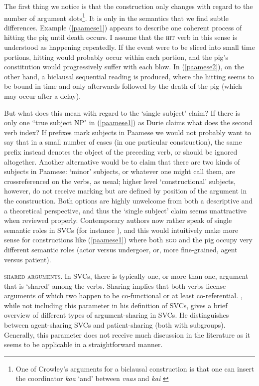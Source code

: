 The first thing we notice is that the construction only changes with regard to the number of argument slots\footnote{One of Crowley's arguments for a biclausal construction is that one can insert the coordinator \textit{kaa} `and' between \textit{vuas} and \textit{kai} \citep[56]{crowley2002serial}}. It is only in the semantics that we find subtle differences. Example (\ref{paamese1}) appears to describe one coherent process of hitting the pig until death occurs. I assume that the \textsc{hit} verb in this sense is understood as happening repeatedly. If the event were to be sliced into small time portions, hitting would probably occur within each portion, and the pig's constitution would progressively suffer with each blow. In (\ref{paamese2}), on the other hand, a biclausal sequential reading is produced, where the hitting seems to be bound in time and only afterwards followed by the death of the pig (which may occur after a delay). 

But what does this mean with regard to the `single subject' claim? If there is only one ``true subject NP" in (\ref{paamese1}) as Durie claims what does the second verb index? If prefixes mark subjects in Paamese we would not probably want to say that in a small number of cases (in one particular construction), the same prefix instead denotes the object of the preceding verb, or should be ignored altogether. Another alternative would be to claim that there are two kinds of subjects in Paamese: `minor' subjects, or whatever one might call them, are crossreferenced on the verbs, as usual; higher level `constructional' subjects, however, do not receive marking but are defined by position of the argument in the construction. Both options are highly unwelcome from both a descriptive and a theoretical perspective, and thus the `single subject' claim seems unattractive when reviewed properly. Contemporary authors now rather speak of single semantic roles in SVCs (for instance \citealt{haspelmath2016serial}), and this would intuitively make more sense for constructions like (\ref{paamese1}) where both \textsc{ego} and the pig occupy very different semantic roles (actor versus undergoer, or, more fine-grained, agent versus patient).

\textsc{shared arguments}. In SVCs, there is typically one, or more than one, argument that is `shared' among the verbs. Sharing implies that both verbs license arguments of which two happen to be co-functional or at least co-referential. \citet{haspelmath2016serial}, while not including this parameter in his definition of SVCs, gives a brief overview of different types of argument-sharing in SVCs. He distinguishes between agent-sharing SVCs and patient-sharing (both with subgroups). Generally, this parameter does not receive much discussion in the literature as it seems to be applicable in a straightforward manner.

